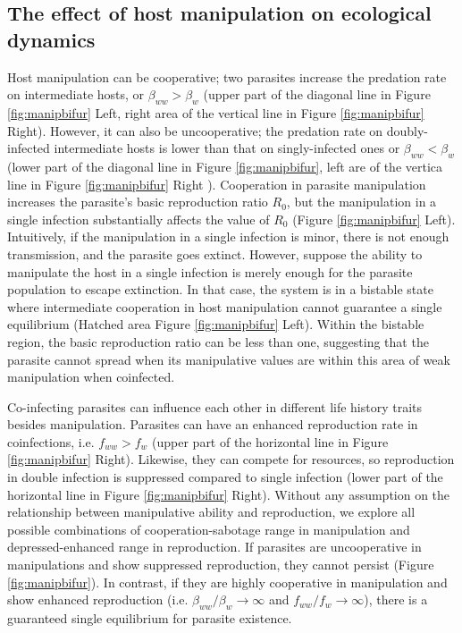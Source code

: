\documentclass[a4paper]{scrartcl}
\begin{document}
\subsection*{The effect of host manipulation on ecological dynamics}

Host manipulation can be cooperative; two parasites increase the predation rate on intermediate hosts, or $\beta_{ww} > \beta_w$  (upper part of the diagonal line in Figure \ref{fig:manipbifur} Left, right area of the vertical line in Figure \ref{fig:manipbifur} Right). 
However, it can also be uncooperative; the predation rate on doubly-infected intermediate hosts is lower than that on singly-infected ones or $\beta_{ww} < \beta_w$(lower part of the diagonal line in Figure \ref{fig:manipbifur}, left are of the vertica line in Figure \ref{fig:manipbifur} Right ).
Cooperation in parasite manipulation increases the parasite's basic reproduction ratio $R_0$, but the manipulation in a single infection substantially affects the value of $R_0$ (Figure \ref{fig:manipbifur} Left). 
Intuitively, if the manipulation in a single infection is minor, there is not enough transmission, and the parasite goes extinct.
However, suppose the ability to manipulate the host in a single infection is merely enough for the parasite population to escape extinction. 
In that case, the system is in a bistable state where intermediate cooperation in host manipulation cannot guarantee a single equilibrium (Hatched area Figure \ref{fig:manipbifur} Left). 
Within the bistable region, the basic reproduction ratio can be less than one, suggesting that the parasite cannot spread when its manipulative values are within this area of weak manipulation when coinfected. 

Co-infecting parasites can influence each other in different life history traits besides manipulation.
Parasites can have an enhanced reproduction rate in coinfections, i.e. $f_{ww} > f_w$ (upper part of the horizontal line in Figure \ref{fig:manipbifur} Right). 
Likewise, they can compete for resources, so reproduction in double infection is suppressed compared to single infection (lower part of the horizontal line in Figure \ref{fig:manipbifur} Right). 
Without any assumption on the relationship between manipulative ability and reproduction, we explore all possible combinations of cooperation-sabotage range in manipulation and depressed-enhanced range in reproduction.
If parasites are uncooperative in manipulations and show suppressed reproduction, they cannot persist (Figure \ref{fig:manipbifur}). 
In contrast, if they are highly cooperative in manipulation and show enhanced reproduction (i.e. $\beta_{ww}/\beta_w \rightarrow \infty$ and $f_{ww}/f_w \rightarrow \infty$), there is a guaranteed single equilibrium for parasite existence. 
\end{document}
